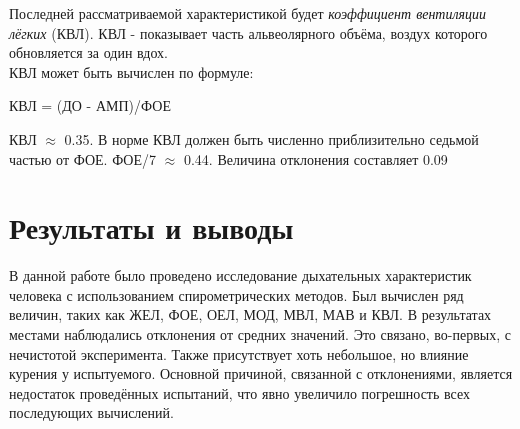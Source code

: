 \documentclass{article}
\begin{document}
        Последней рассматриваемой характеристикой будет \textit{коэффициент вентиляции лёгких} (КВЛ).
        КВЛ - показывает часть альвеолярного объёма, воздух которого
        обновляется за один вдох.\\

        КВЛ может быть вычислен по формуле:
        
        \begin{center}
            КВЛ = (ДО - АМП)/ФОЕ
        \end{center}

        КВЛ $\approx$ 0.35. В норме КВЛ должен быть численно приблизительно седьмой частью от ФОЕ.
        ФОЕ/7 $\approx$ 0.44. Величина отклонения составляет 0.09
    \newpage

    \section*{Результаты и выводы}

        \hspace*{4mm} В данной работе было проведено исследование дыхательных характеристик человека
        с использованием спирометрических методов. Был вычислен ряд величин, таких как ЖЕЛ, ФОЕ,
        ОЕЛ, МОД, МВЛ, МАВ и КВЛ. В результатах местами наблюдались отклонения от средних значений.
        Это связано, во-первых, с нечистотой эксперимента. Также присутствует хоть небольшое, но влияние курения у испытуемого.
        Основной причиной, связанной с отклонениями, является недостаток проведённых испытаний, что явно увеличило
        погрешность всех последующих вычислений.
        
\end{document}
